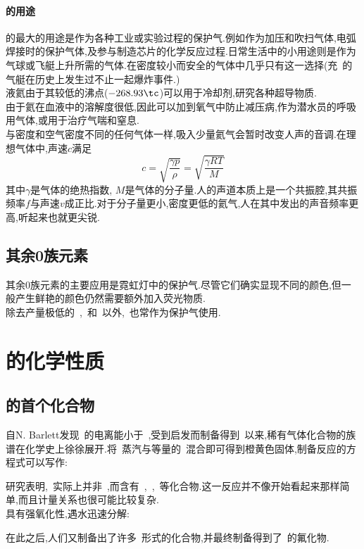 \documentclass{ctexbook}
\begin{document}
\paragraph{的用途}
\indent {}的最大的用途是作为各种工业或实验过程的保护气.例如作为加压和吹扫气体,电弧焊接时的保护气体,及参与制造芯片的化学反应过程.日常生活中的小用途则是作为气球或飞艇上升所需的气体.在密度较小而安全的气体中几乎只有这一选择(充~的气艇在历史上发生过不止一起爆炸事件.)\\
\indent 液氦由于其较低的沸点($-268.93\tc$)可以用于冷却剂,研究各种超导物质.\\
\indent 由于氦在血液中的溶解度很低,因此可以加到氧气中防止减压病,作为潜水员的呼吸用气体,或用于治疗气喘和窒息.\\
\indent 与密度和空气密度不同的任何气体一样,吸入少量氦气会暂时改变人声的音调.在理想气体中,声速$c$满足
\[c=\sqrt{\dfrac{\gamma p}{\rho}}=\sqrt{\dfrac{\gamma RT}{M}}\]
其中$\gamma$是气体的绝热指数, $M$是气体的分子量.人的声道本质上是一个共振腔,其共振频率$f$与声速$v$成正比.对于分子量更小,密度更低的氦气,人在其中发出的声音频率更高,听起来也就更尖锐.
\subsection{其余0族元素}
其余0族元素的主要应用是霓虹灯中的保护气.尽管它们确实显现不同的颜色,但一般产生鲜艳的颜色仍然需要额外加入荧光物质.\\
\indent 除去产量极低的~,~和~以外,~也常作为保护气使用.
\section{的化学性质}
\subsection{的首个化合物}
自N. Barlett发现~的电离能小于~,受到启发而制备得到~以来,稀有气体化合物的族谱在化学史上徐徐展开.将~蒸汽与等量的~混合即可得到橙黄色固体,制备反应的方程式可以写作:
\begin{tightcenter}
\end{tightcenter}
研究表明\cite{GRAHAM2000321},~实际上并非~\ce{[Xe]+[PtF6]-},而含有~\ce{[XeF]+[PtF6]-},~\ce{[XeF]+[Pt2F11]-},~\ce{[Xe2F3]+[PtF6]-}等化合物.这一反应并不像开始看起来那样简单,而且计量关系也很可能比较复杂.\\
\indent {}具有强氧化性,遇水迅速分解:
\begin{tightcenter}
\end{tightcenter}
在此之后,人们又制备出了许多~形式的化合物,并最终制备得到了~的氟化物.
\end{document}
